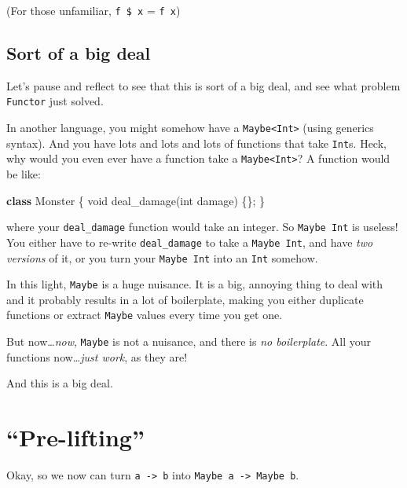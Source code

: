 \documentclass[]{article}
\newenvironment{Shaded}{}{}
\newcommand{\DataTypeTok}[1]{\textcolor[rgb]{0.56,0.13,0.00}{#1}}
\newcommand{\FunctionTok}[1]{\textcolor[rgb]{0.02,0.16,0.49}{#1}}
\newcommand{\KeywordTok}[1]{\textcolor[rgb]{0.00,0.44,0.13}{\textbf{#1}}}
\newcommand{\NormalTok}[1]{#1}
\begin{document}
(For those unfamiliar, \texttt{f\ \$\ x} = \texttt{f\ x})

\hypertarget{sort-of-a-big-deal}{%
\subsection{Sort of a big deal}\label{sort-of-a-big-deal}}

Let's pause and reflect to see that this is sort of a big deal, and see what
problem \texttt{Functor} just solved.

In another language, you might somehow have a
\texttt{Maybe\textless{}Int\textgreater{}} (using generics syntax). And you have
lots and lots and lots of functions that take \texttt{Int}s. Heck, why would you
even ever have a function take a \texttt{Maybe\textless{}Int\textgreater{}}? A
function would be like:

\begin{Shaded}
\begin{Highlighting}[]
\KeywordTok{class}\NormalTok{ Monster \{}
    \DataTypeTok{void} \FunctionTok{deal_damage}\NormalTok{(}\DataTypeTok{int}\NormalTok{ damage) \{\};}
\NormalTok{\}}
\end{Highlighting}
\end{Shaded}

where your \texttt{deal\_damage} function would take an integer. So
\texttt{Maybe\ Int} is useless! You either have to re-write
\texttt{deal\_damage} to take a \texttt{Maybe\ Int}, and have \emph{two
versions} of it, or you turn your \texttt{Maybe\ Int} into an \texttt{Int}
somehow.

In this light, \texttt{Maybe} is a huge nuisance. It is a big, annoying thing to
deal with and it probably results in a lot of boilerplate, making you either
duplicate functions or extract \texttt{Maybe} values every time you get one.

But now\ldots{}\emph{now}, \texttt{Maybe} is not a nuisance, and there is
\emph{no boilerplate}. All your functions now\ldots{}\emph{just work}, as they
are!

And this is a big deal.

\hypertarget{pre-lifting}{%
\section{``Pre-lifting''}\label{pre-lifting}}

Okay, so we now can turn \texttt{a\ -\textgreater{}\ b} into
\texttt{Maybe\ a\ -\textgreater{}\ Maybe\ b}.
\end{document}
